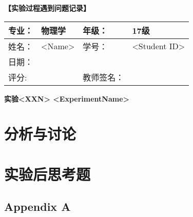 \documentclass{ctexart}
\numberwithin{equation}{section}%
\newcommand{\ExpTitle}{实验<XXN> <ExperimentName>}
\newcommand{\stuName}{<Name>}
\newcommand{\stuID}{<Student ID>}
\theoremstyle{ansstyle}
\begin{document}
\large{\textbf{【实验过程遇到问题记录】}} %

\newpage

\begin{center}
    \begin{tabular}{|p{2cm}|p{4cm}|p{4cm}|p{4cm}|}
        \hline
        专业： & 物理学 & 年级： & 17级 \\
        \hline
        姓名： & \stuName & 学号： & \stuID \\
        \hline
        日期： &  & & \\
        \hline
        评分:  &   & 教师签名：& \\
        \hline
    \end{tabular}
\end{center}


\begin{center}
    \LARGE{\textbf{\ExpTitle}}
\end{center}



\section{分析与讨论}



\section{实验后思考题}


\begin{appendices}
    \section{Appendix A}
\end{appendices}
\end{document}
